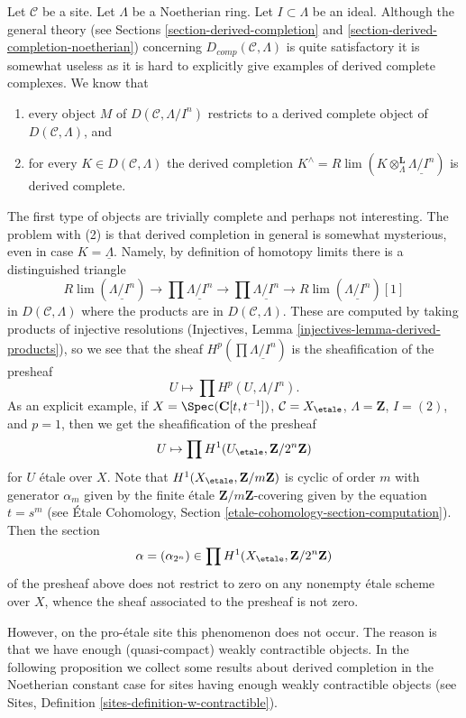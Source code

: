 \noindent
Let $\mathcal{C}$ be a site. Let $\Lambda$ be a Noetherian ring.
Let $I \subset \Lambda$ be an ideal. Although the general theory
(see Sections \ref{section-derived-completion} and
\ref{section-derived-completion-noetherian})
concerning $D_{comp}(\mathcal{C}, \Lambda)$ is quite satisfactory
it is somewhat useless as it is hard to explicitly give
examples of derived complete complexes. We know that
\begin{enumerate}
\item every object $M$ of $D(\mathcal{C}, \Lambda/I^n)$ restricts to a
derived complete object of $D(\mathcal{C}, \Lambda)$, and
\item for every $K \in D(\mathcal{C}, \Lambda)$ the derived completion
$K^\wedge = R\lim (K \otimes_\Lambda^\mathbf{L} \underline{\Lambda/I^n})$
is derived complete.
\end{enumerate}
The first type of objects are trivially complete and perhaps not
interesting. The problem with (2) is that derived completion
in general is somewhat mysterious, even in case $K = \underline{\Lambda}$.
Namely, by definition of homotopy limits there
is a distinguished triangle
$$
R\lim(\underline{\Lambda/I^n}) \to
\prod \underline{\Lambda/I^n} \to
\prod \underline{\Lambda/I^n} \to
R\lim(\underline{\Lambda/I^n})[1]
$$
in $D(\mathcal{C}, \Lambda)$ where the products are in
$D(\mathcal{C}, \Lambda)$. These are computed by taking products
of injective resolutions
(Injectives, Lemma \ref{injectives-lemma-derived-products}),
so we see that the sheaf $H^p(\prod \underline{\Lambda/I^n})$
is the sheafification of the presheaf
$$
U \longmapsto \prod H^p(U, \Lambda/I^n).
$$
As an explicit example, if $X = \Spec(\mathbf{C}[t, t^{-1}])$,
$\mathcal{C} = X_\etale$, $\Lambda = \mathbf{Z}$, $I = (2)$, and
$p = 1$, then we get the sheafification of the presheaf
$$
U \mapsto \prod H^1(U_\etale, \mathbf{Z}/2^n\mathbf{Z})
$$
for $U$ \'etale over $X$. Note that $H^1(X_\etale, \mathbf{Z}/m\mathbf{Z})$
is cyclic of order $m$ with generator $\alpha_m$ given by the finite \'etale
$\mathbf{Z}/m\mathbf{Z}$-covering given by the equation $t = s^m$
(see \'Etale Cohomology, Section \ref{etale-cohomology-section-computation}).
Then the section
$$
\alpha = (\alpha_{2^n}) \in \prod H^1(X_\etale, \mathbf{Z}/2^n\mathbf{Z})
$$
of the presheaf above does not restrict to zero on any nonempty \'etale
scheme over $X$, whence the sheaf associated to the presheaf is not zero.

\medskip\noindent
However, on the pro-\'etale site this phenomenon does not occur.
The reason is that we have enough (quasi-compact) weakly contractible objects.
In the following proposition we collect some results about derived
completion in the Noetherian constant case for sites having enough
weakly contractible objects (see
Sites, Definition \ref{sites-definition-w-contractible}).

